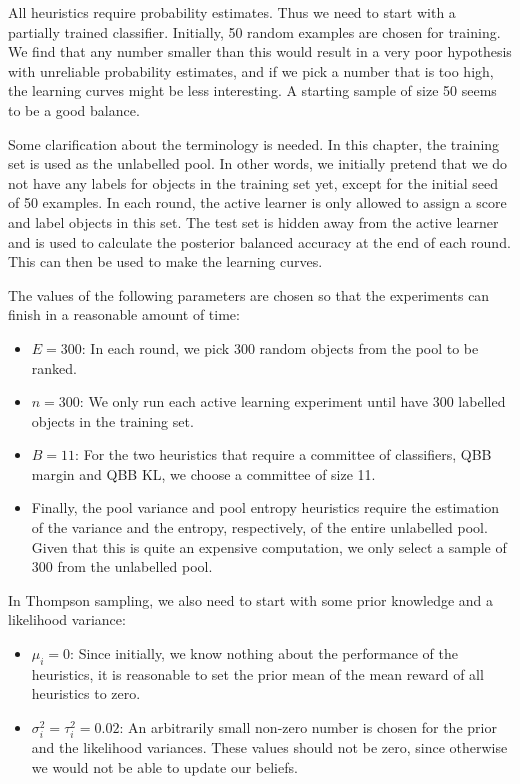 All heuristics require probability estimates. Thus we need to start with a partially trained
classifier. Initially, 50 random examples are chosen for training. We find that any number smaller
than this would result in a very poor hypothesis with unreliable probability estimates, and if we
pick a number that is too high, the learning curves might be less interesting. A starting sample of
size 50 seems to be a good balance.

Some clarification about the terminology is needed. In this chapter, the training set is used as
the unlabelled pool. In other words, we initially pretend that we do not have any labels for
objects in the training set yet, except for the initial seed of 50 examples. In each round, the
active learner is only allowed to assign a score and label objects in this set. The test set is
hidden away from the active learner and is used to calculate the posterior balanced accuracy at the
end of each round. This can then be used to make the learning curves.

The values of the following parameters are chosen so that the experiments can finish in a reasonable
amount of time:
\begin{itemize}
    \item $E = 300$: In each round, we pick 300 random objects from the pool to be ranked.
    
    \item $n = 300$: We only run each active learning experiment until have 300 labelled
    objects in the training set.
    
    \item $B = 11$: For the two heuristics that require a committee of classifiers, QBB margin and
    QBB KL, we choose a committee of size 11.
    
    \item Finally, the pool variance and pool entropy heuristics require the estimation of the
    variance and the entropy, respectively, of the entire unlabelled pool. Given that this is quite
    an expensive computation, we only select a sample of 300 from the unlabelled pool.
\end{itemize}
In Thompson sampling, we also need to start with some prior knowledge and a likelihood variance:
\begin{itemize}
    \item $\mu_i = 0$: Since initially, we know nothing about the performance of the heuristics, it
    is reasonable to set the prior mean of the mean reward of all heuristics to zero.
    
    \item $\sigma^2_i = \tau^2_i = 0.02$: An arbitrarily small non-zero number is chosen for the prior and
    the likelihood variances. These values should not be zero, since otherwise we would not be able
    to update our beliefs.
\end{itemize}


